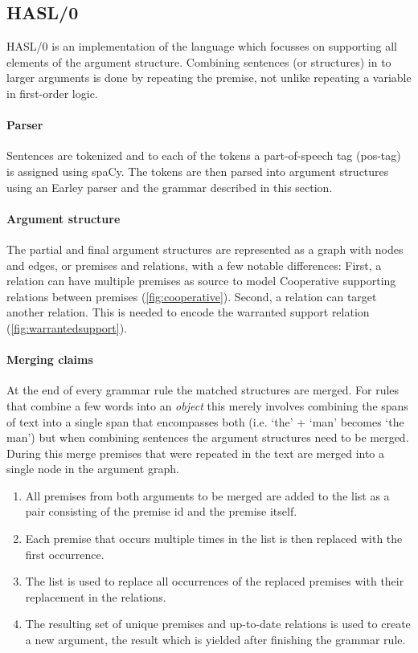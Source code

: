 \subsection{HASL/0}
HASL/0 is an implementation of the language which focusses on supporting all elements of the argument structure. Combining sentences (or structures) in to larger arguments is done by repeating the premise, not unlike repeating a variable in first-order logic.

\paragraph{Parser} Sentences are tokenized and to each of the tokens a part-of-speech tag (pos-tag) is assigned using spaCy. The tokens are then parsed into argument structures using an Earley parser and the grammar described in this section.

\paragraph{Argument structure} The partial and final argument structures are represented as a graph with nodes and edges, or premises and relations, with a few notable differences: First, a relation can have multiple premises as source to model Cooperative supporting relations between premises (\autoref{fig:cooperative}). Second, a relation can target another relation. This is needed to encode the warranted support relation (\autoref{fig:warrantedsupport}).

\paragraph{Merging claims} At the end of every grammar rule the matched structures are merged. For rules that combine a few words into an \emph{object} this merely involves combining the spans of text into a single span that encompasses both (i.e. `the' + `man' becomes `the man') but when combining sentences the argument structures need to be merged. During this merge premises that were repeated in the text are merged into a single node in the argument graph.

\begin{enumerate}
    \item All premises from both arguments to be merged are added to the list as a pair consisting of the premise id and the premise itself.
    \item Each premise that occurs multiple times in the list is then replaced with the first occurrence.
    \item The list is used to replace all occurrences of the replaced premises with their replacement in the relations.
    \item The resulting set of unique premises and up-to-date relations is used to create a new argument, the result which is yielded after finishing the grammar rule.
\end{enumerate}

